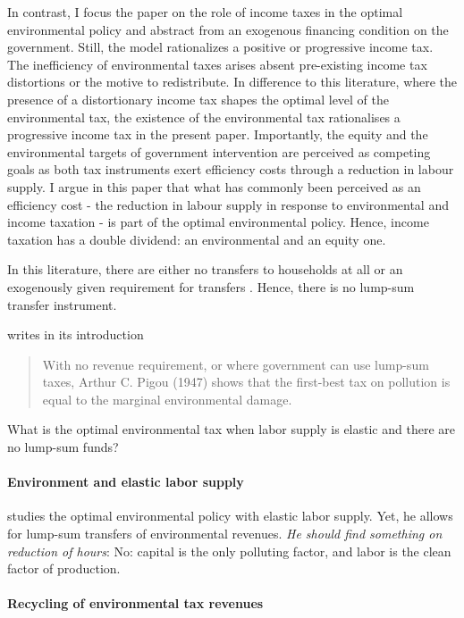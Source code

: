 In contrast, I focus the paper on the role of income taxes in the optimal environmental policy and abstract from an exogenous financing condition on the government. Still, the model rationalizes a positive or progressive income tax.
 The inefficiency of environmental taxes arises absent pre-existing income tax distortions or the motive to redistribute.
In difference to this literature, where the presence of a distortionary income tax shapes the optimal level of the environmental tax, the existence of the environmental tax rationalises a progressive income tax in the present paper.
Importantly, the equity and the environmental targets of government intervention are perceived as competing goals as both tax instruments exert efficiency costs through a reduction in labour supply. 
I argue in this paper that what has commonly been perceived as an efficiency cost -  the reduction in labour supply in response to environmental and income taxation - is part of the optimal environmental policy. Hence, income taxation has a double dividend: an environmental and an equity one.  

In this literature, there are either no transfers to households at all \citep{Bovenberg2002EnvironmentalRegulation, LansBovenberg1994EnvironmentalTaxation} or an exogenously given requirement for transfers \citep{Barrage2019OptimalPolicy}. Hence, there is no lump-sum transfer instrument.

\citep{Fullerton1997EnvironmentalComment} writes in its introduction 
\begin{quote}
	With no revenue requirement, or where government can use lump-sum taxes, Arthur C. Pigou (1947) shows that the first-best tax on pollution is equal to the marginal environmental damage.
\end{quote}
\ar What is the optimal environmental tax when labor supply is elastic and there are no lump-sum funds?
\paragraph{Environment and elastic labor supply}
\cite{Oueslati2002EnvironmentalSupply} studies the optimal environmental policy with elastic labor supply. Yet, he allows for lump-sum transfers of environmental revenues. \textit{He should find something on reduction of hours}: No: capital is the only polluting factor, and labor is the clean factor of production.
\paragraph{Recycling of environmental tax revenues}
